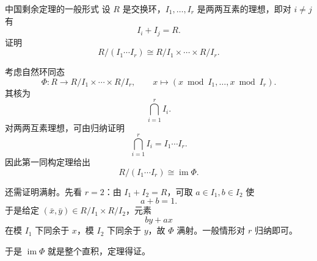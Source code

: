 \begin{problem}{中国剩余定理的一般形式}
\hard
设 $R$ 是交换环，$I_1,\dots,I_r$ 是两两互素的理想，即对 $i\neq j$ 有
\[
I_i+I_j=R.
\]
证明
\[
R/(I_1\cdots I_r)\cong R/I_1\times\cdots\times R/I_r.
\]
\end{problem}
\begin{solution}
考虑自然环同态
\[
\Phi:R\to R/I_1\times\cdots\times R/I_r,
\qquad
x\mapsto(x\bmod I_1,\dots,x\bmod I_r).
\]
其核为
\[
\bigcap_{i=1}^r I_i.
\]
对两两互素理想，可由归纳证明
\[
\bigcap_{i=1}^r I_i=I_1\cdots I_r.
\]
因此第一同构定理给出
\[
R/(I_1\cdots I_r)\cong \operatorname{im}\Phi.
\]

还需证明满射。先看 $r=2$：由 $I_1+I_2=R$，可取 $a\in I_1,b\in I_2$ 使
\[
a+b=1.
\]
于是给定 $(\bar x,\bar y)\in R/I_1\times R/I_2$，元素
\[
by+ax
\]
在模 $I_1$ 下同余于 $x$，模 $I_2$ 下同余于 $y$，故 $\Phi$ 满射。一般情形对 $r$ 归纳即可。

于是 $\operatorname{im}\Phi$ 就是整个直积，定理得证。
\end{solution}
